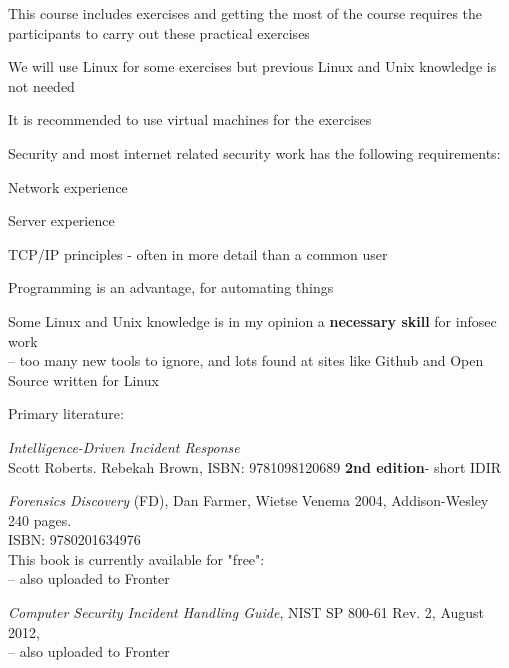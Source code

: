 \documentclass[Screen16to9,17pt]{foils}
\begin{document}

\begin{list1}
\item This course includes exercises and getting the most of the course requires the participants to carry out these practical exercises
\item We will use Linux for some exercises but previous Linux and Unix knowledge is not needed
\item It is recommended to use virtual machines for the exercises
\item Security and most internet related security work has the following requirements:
\begin{list2}
\item Network experience
\item Server experience
\item TCP/IP principles - often in more detail than a common user
\item Programming is an advantage, for automating things
\item Some Linux and Unix knowledge is in my opinion a {\bf necessary skill} for infosec work\\
-- too many new tools to ignore, and lots found at sites like Github and Open Source written for Linux
\end{list2}
\end{list1}



Primary literature:
\begin{list2}
\item \emph{Intelligence-Driven Incident Response} \\
 Scott Roberts. Rebekah Brown, ISBN: 9781098120689 {\bf 2nd edition}- short IDIR


\item \emph{Forensics Discovery} (FD), Dan Farmer, Wietse Venema 2004, Addison-Wesley 240 pages.\\
ISBN: 9780201634976\\
This book is currently available for "free":\\
 -- also uploaded to Fronter

\item \emph{
Computer Security Incident Handling Guide}, NIST SP 800-61 Rev. 2, August 2012,\\
 -- also uploaded to Fronter
\end{list2}
\end{document}
